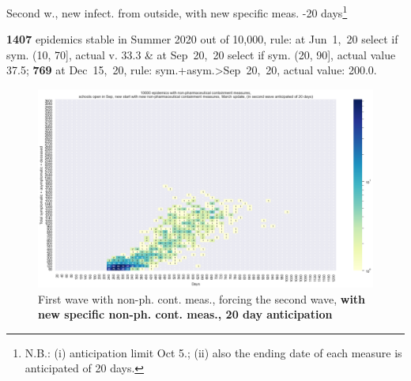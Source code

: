 \documentclass[9pt]{beamer}
\begin{document}
\begin{frame}{Second w., new infect. from outside, with new specific meas. -20 days\footnote{N.B.: (i) anticipation limit Oct 5.; (ii) also the ending date of each measure is anticipated of 20 days.}}


\textbf{1407} {\tiny epidemics stable in Summer 2020 out of 10,000, rule: at Jun~1,~20 select if sym. (10, 70], actual v. 33.3 \& at Sep~20,~20 select if sym. (20, 90], actual value 37.5;} \textbf{769} {\tiny at Dec~15,~20, rule: sym.+asym.>Sep~20,~20, actual value: 200.0.}

\begin{figure}[H]
\center
\includegraphics[scale=0.17]{10kForceWave2Contr2M-20.png}
\caption{First wave with non-ph. cont. meas., forcing the second wave, \textbf{with new specific non-ph. cont. meas., 20 day anticipation}}
\label{selForceWave2Contr2M-20}
\end{figure}



\end{frame}
\end{document}
